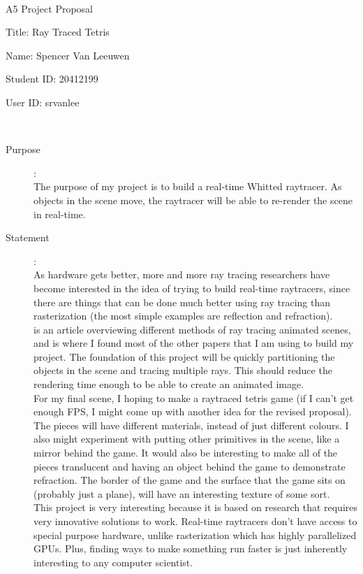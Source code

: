 \documentclass {article}
\begin{document}
~\vfill
\begin{center}
\Large

A5 Project Proposal

Title: Ray Traced Tetris

Name: Spencer Van Leeuwen

Student ID: 20412199

User ID: srvanlee
\end{center}
\vfill ~\vfill~
\newpage
{}
\begin{description}
\item[Purpose]:\\
    The purpose of my project is to build a real-time Whitted raytracer. As objects
    in the scene move, the raytracer will be able to re-render the scene in real-time.


\item[Statement]:\\
    As hardware gets better, more and more ray tracing researchers have become
    interested in the idea of trying to build real-time raytracers, since there
    are things that can be done much better using ray tracing than rasterization
    (the most simple examples are reflection and refraction). \\

    \cite{CGF13} is an article overviewing different methods of ray tracing animated
    scenes, and is where I found most of the other papers that I am using to build my
    project. The foundation of this project will be quickly partitioning the objects in the
    scene and tracing multiple rays. This should reduce the rendering time enough
    to be able to create an animated image. \\

    For my final scene, I hoping to make a raytraced tetris game (if I can't
    get enough FPS, I might come up with another idea for the revised proposal). The pieces
    will have different materials, instead of just different colours. I also might
    experiment with putting other primitives in the scene, like a mirror behind the
    game. It would also be interesting to make all of the pieces translucent and having
    an object behind the game to demonstrate refraction. The border of the game and the
    surface that the game sits on (probably just a plane), will have an interesting texture
    of some sort. \\

    This project is very interesting because it is based on research that requires very
    innovative solutions to work. Real-time raytracers don't have access to special purpose
    hardware, unlike rasterization which has highly parallelized GPUs. Plus, finding ways
    to make something run faster is just inherently interesting to any computer scientist. \\


\end{description}
\end{document}
